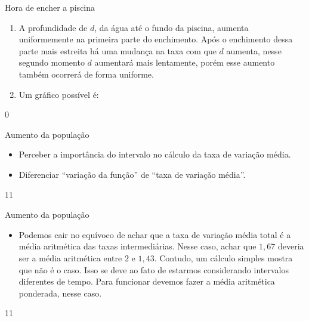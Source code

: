 \begin{answer}{Hora de encher a piscina}
{
\begin{enumerate}
\item A profundidade de $d$, da água até o fundo da piscina, aumenta uniformemente na primeira parte do enchimento. Após o enchimento dessa parte mais estreita há uma mudança na taxa com que $d$ aumenta, nesse segundo momento $d$ aumentará mais lentamente, porém esse aumento também ocorrerá de forma uniforme.

\item Um gráfico possível é:

\end{enumerate}
}{0}
\end{answer}
\clearmargin
\begin{objectives}{Aumento da população}
{
\begin{itemize}

\item Perceber a importância do intervalo no cálculo da taxa de variação média.

\item Diferenciar “variação da função” de “taxa de variação média”.

\end{itemize}
}{1}{1}
\end{objectives}
\begin{sugestions}{Aumento da população}
{
\begin{itemize}
\item Podemos cair no equívoco de achar que a taxa de variação média total é a média
aritmética das taxas intermediárias. Nesse caso, achar que $1{,}67$ deveria ser a média
aritmética entre $2$ e $1{,}43$. Contudo, um cálculo simples mostra que não é o caso. Isso se
deve ao fato de estarmos considerando intervalos diferentes de tempo. Para funcionar
devemos fazer a média aritmética ponderada, nesse caso.
\end{itemize}
}{1}{1}
\end{sugestions}
